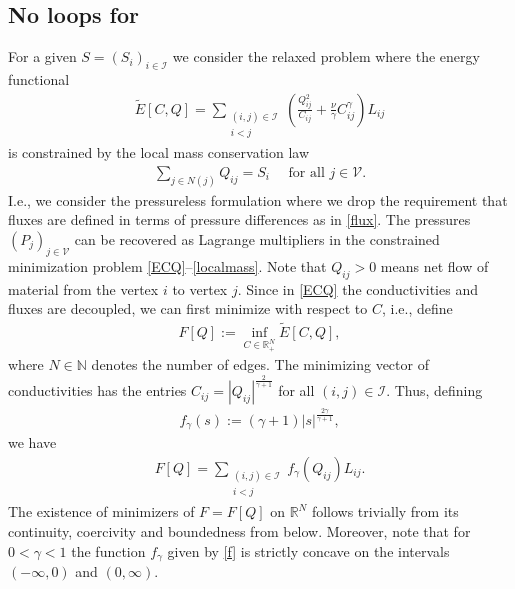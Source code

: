 \documentclass{article}
\numberwithin{equation}{section}
\newcommand{\R}{\mathbb{R}}
\newcommand{\N}{\mathbb{N}}
\begin{document}
\subsection{No loops for }\label{subsec:noloops}
For a given $S=(S_i)_{i\in\mathcal{I}}$ we consider the relaxed problem
where the energy functional
\begin{align}\label{ECQ}
   \widetilde E[C, Q] = \sum_{\substack{(i,j)\in \mathcal{I}\\i< j}} \left( \frac{Q_{ij}^2 }{C_{ij}} + \frac{\nu}{\gamma} C_{ij}^\gamma \right) L_{ij}
\end{align}
is constrained by the local mass conservation law
\begin{align}  \label{localmass}
  \sum_{j\in N(j)} Q_{ij} = S_i \quad \mbox{ for all } j\in \mathcal{V}.
\end{align}
I.e., we consider the pressureless formulation where we drop the requirement
that fluxes are defined in terms of pressure differences as in \eqref{flux}.
The pressures $(P_j)_{j\in \mathcal{V}}$ can be recovered as Lagrange multipliers
in the constrained minimization problem \eqref{ECQ}--\eqref{localmass}.
Note that $Q_{ij}>0$ means net flow of material from the vertex $i$ to vertex $j$.
Since in \eqref{ECQ} the conductivities and fluxes are decoupled,
we can first minimize with respect to $C$, i.e., define
\begin{align}   \label{F}
   F[Q] := \inf_{C\in\R^N_+} \widetilde E[C,Q],
\end{align}
where $N\in\N$ denotes the number of edges. The minimizing vector of conductivities has the entries $C_{ij} = |Q_{ij}|^\frac{2}{\gamma+1}$ for all $(i,j)\in \mathcal{I} $.
Thus, defining
\begin{align} \label{f}
   f_\gamma(s) := (\gamma+1) |s|^\frac{2\gamma}{\gamma+1},
\end{align}
we have
\begin{align}  \label{F2}
   F[Q] = \sum_{\substack{(i,j)\in \mathcal{I}\\i< j}} f_\gamma(Q_{ij}) L_{ij}.
\end{align}
The existence of minimizers of $F=F[Q]$ on $\R^N$ follows
trivially from its continuity, coercivity and boundedness from below.
Moreover, note that for $0< \gamma < 1$ the function $f_\gamma$ given by \eqref{f} is strictly concave on the intervals $(-\infty,0)$ and $(0,\infty)$.
\vspace{2mm}
\end{document}
